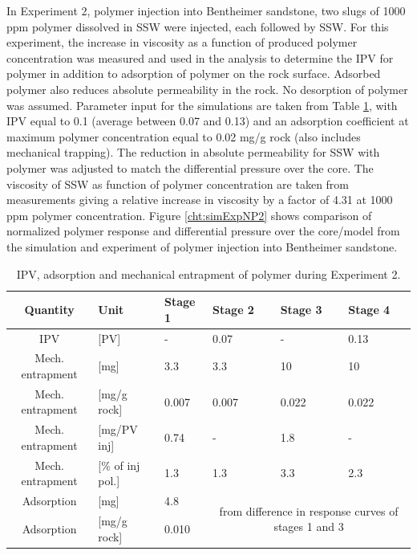 \documentclass[nanomaterials,article,submit,moreauthors,pdftex]{Definitions/mdpi}
\begin{document}
In Experiment 2, polymer injection into Bentheimer sandstone, two slugs of 1000 ppm polymer dissolved in SSW were injected, each followed by SSW. For this experiment, the increase in viscosity as a function of produced polymer concentration was measured and used in the analysis to determine the IPV for polymer in addition to adsorption of polymer on the rock surface. Adsorbed polymer also reduces absolute permeability in the rock. No desorption of polymer was assumed. Parameter input for the simulations are taken from Table \ref{tab:ipvexp2}, with IPV equal to 0.1 (average between 0.07 and 0.13) and an adsorption coefficient at maximum polymer concentration equal to 0.02 mg/g rock (also includes mechanical trapping). The reduction in absolute permeability for SSW with polymer was adjusted to match the differential pressure over the core. The viscosity of SSW as function of polymer concentration are taken from measurements giving a relative increase in viscosity by a factor of 4.31 at 1000 ppm polymer concentration. Figure \ref{cht:simExpNP2} shows comparison of normalized polymer response and differential pressure over the core/model from the simulation and experiment of polymer injection into Bentheimer sandstone.

\begin{table}[h!] 
\small
\centering
\caption{IPV, adsorption and mechanical entrapment of polymer during Experiment 2.}
\label{tab:ipvexp2}
\begin{tabular}{c l l l l l } 
\toprule
\textbf{Quantity} & \textbf{Unit} & \textbf{Stage 1} & \textbf{Stage 2} & \textbf{Stage 3} & \textbf{Stage 4} \\ 
\midrule 
IPV                & [PV]           & -         & 0.07     & -         & 0.13     \\
Mech. entrapment   & [mg]          & 3.3       & 3.3       & 10       & 10       \\ 
Mech. entrapment   & [mg/g rock]   & 0.007     & 0.007     & 0.022     & 0.022     \\ 
Mech. entrapment   & [mg/PV inj]   & 0.74      & -         & 1.8      & -         \\
Mech. entrapment   & [\% of inj pol.]& 1.3       & 1.3       & 3.3       & 2.3       \\ 
Adsorption         & [mg]          & 4.8       &   \multicolumn{3}{c}{\multirow{2}{15em}{from difference in response curves of stages 1 and 3}}        \\
Adsorption         & [mg/g rock]   & 0.010      &  \multicolumn{3}{c}{}    \\ 
\bottomrule
\end{tabular}
\end{table}
\end{document}
